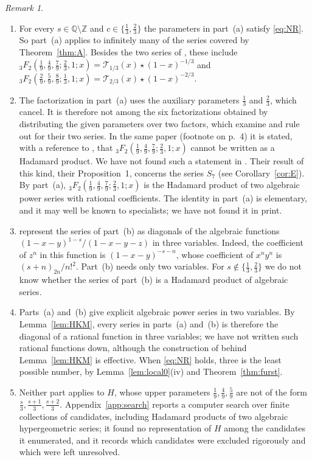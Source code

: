 \documentclass[11pt]{amsart}
\theoremstyle{definition}
\theoremstyle{remark}
\newtheorem{remark}[theorem]{Remark}
\numberwithin{equation}{section}
\newcommand{\Q}{\mathbb{Q}}
\newcommand{\Z}{\mathbb{Z}}
\newcommand{\cT}{\mathcal{T}}
\begin{document}
\begin{remark}\label{rem:propD}
\begin{enumerate}[label=(\arabic*),leftmargin=2em]
\item For every $s\in\Q\setminus\Z$ and $c\in\{\frac13,\frac23\}$ the parameters in part~(a) satisfy \eqref{eq:NR}. So part~(a) applies to infinitely many of the series covered by Theorem~\ref{thm:A}. Besides the two series of \citet{AbdelazizKoutschanMaillard2020}, these include ${}_3F_2(\frac19,\frac49,\frac79;\frac23,1;x)=\cT_{1/3}(x)\star(1-x)^{-1/3}$ and ${}_3F_2(\frac29,\frac59,\frac89;\frac13,1;x)=\cT_{2/3}(x)\star(1-x)^{-2/3}$.
\item The factorization in part~(a) uses the auxiliary parameters $\frac13$ and $\frac23$, which cancel. It is therefore not among the six factorizations obtained by distributing the given parameters over two factors, which \citet[\S2.3]{AbdelazizKoutschanMaillard2020} examine and rule out for their two series. In the same paper (footnote on p.~4) it is stated, with a reference to \citet{RivoalRoques2014}, that ${}_3F_2(\frac19,\frac49,\frac79;\frac23,1;x)$ cannot be written as a Hadamard product. We have not found such a statement in \citet{RivoalRoques2014}. Their result of this kind, their Proposition~1, concerns the series $S_7$ (see Corollary~\ref{cor:E}). By part~(a), ${}_3F_2(\frac19,\frac49,\frac79;\frac23,1;x)$ is the Hadamard product of two algebraic power series with rational coefficients. The identity in part~(a) is elementary, and it may well be known to specialists; we have not found it in print.
\item \citet{AbdelazizKoutschanMaillard2020} represent the series of part~(b) as diagonals of the algebraic functions $(1-x-y)^{1-s}/(1-x-y-z)$ in three variables. Indeed, the coefficient of $z^n$ in this function is $(1-x-y)^{-s-n}$, whose coefficient of $x^ny^n$ is $(s+n)_{2n}/n!^2$. Part~(b) needs only two variables. For $s\notin\{\frac13,\frac23\}$ we do not know whether the series of part~(b) is a Hadamard product of algebraic series.
\item Parts~(a) and~(b) give explicit algebraic power series in two variables. By Lemma~\ref{lem:HKM}, every series in parts~(a) and~(b) is therefore the diagonal of a rational function in three variables; we have not written such rational functions down, although the construction of \citet{DenefLipshitz1987} behind Lemma~\ref{lem:HKM} is effective. When \eqref{eq:NR} holds, three is the least possible number, by Lemma~\ref{lem:local0}(iv) and Theorem~\ref{thm:furst}.
\item Neither part applies to $H$, whose upper parameters $\frac19,\frac49,\frac59$ are not of the form $\frac s3,\frac{s+1}3,\frac{s+2}3$. Appendix~\ref{app:search} reports a computer search over finite collections of candidates, including Hadamard products of two algebraic hypergeometric series; it found no representation of $H$ among the candidates it enumerated, and it records which candidates were excluded rigorously and which were left unresolved.
\end{enumerate}
\end{remark}
\end{document}
